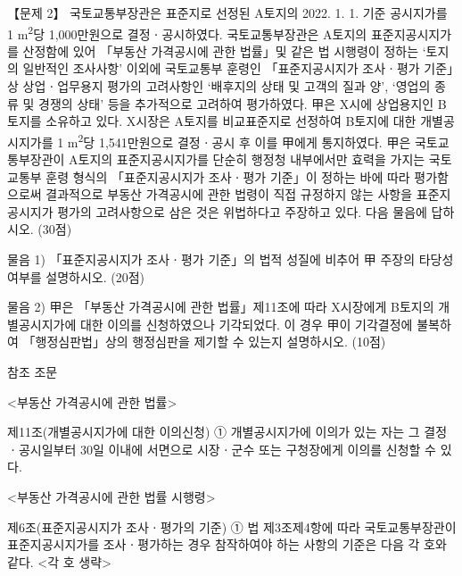 \begin{longquestion}{【문제 2】}
국토교통부장관은 표준지로 선정된 A토지의 2022. 1. 1. 기준 공시지가를 1 m\textsuperscript{2}당 1,000만원으로 결정ㆍ공시하였다. 국토교통부장관은 A토지의 표준지공시지가를 산정함에 있어 「부동산 가격공시에 관한 법률」및 같은 법 시행령이 정하는 ‘토지의 일반적인 조사사항’ 이외에 국토교통부 훈령인 「표준지공시지가 조사ㆍ평가 기준」상 상업ㆍ업무용지 평가의 고려사항인 ‘배후지의 상태 및 고객의 질과 양’, ‘영업의 종류 및 경쟁의 상태’ 등을 추가적으로 고려하여 평가하였다. 甲은 X시에 상업용지인 B토지를 소유하고 있다. X시장은 A토지를 비교표준지로 선정하여 B토지에 대한 개별공시지가를 1 m\textsuperscript{2}당 1,541만원으로 결정ㆍ공시 후 이를 甲에게 통지하였다. 甲은 국토교통부장관이 A토지의 표준지공시지가를 단순히 행정청 내부에서만 효력을 가지는 국토교통부 훈령 형식의 「표준지공시지가 조사ㆍ평가 기준」이 정하는 바에 따라 평가함으로써 결과적으로 부동산 가격공시에 관한 법령이 직접 규정하지 않는 사항을 표준지공시지가 평가의 고려사항으로 삼은 것은 위법하다고 주장하고 있다. 다음 물음에 답하시오. (30점) \par
\medskip\noindent 물음 1) 「표준지공시지가 조사ㆍ평가 기준」의 법적 성질에 비추어 甲 주장의 타당성 여부를 설명하시오. (20점) \par
\medskip\noindent 물음 2) 甲은 「부동산 가격공시에 관한 법률」제11조에 따라 X시장에게 B토지의 개별공시지가에 대한 이의를 신청하였으나 기각되었다. 이 경우 甲이 기각결정에 불복하여 「행정심판법」상의 행정심판을 제기할 수 있는지 설명하시오. (10점) \par
\begin{framedtext}
참조 조문 \par
<부동산 가격공시에 관한 법률> \par
제11조(개별공시지가에 대한 이의신청) ① 개별공시지가에 이의가 있는 자는 그 결정ㆍ공시일부터 30일 이내에 서면으로 시장ㆍ군수 또는 구청장에게 이의를 신청할 수 있다. \par
<부동산 가격공시에 관한 법률 시행령> \par
제6조(표준지공시지가 조사ㆍ평가의 기준) ① 법 제3조제4항에 따라 국토교통부장관이 표준지공시지가를 조사ㆍ평가하는 경우 참작하여야 하는 사항의 기준은 다음 각 호와 같다. <각 호 생략> \par

\end{framedtext}
\end{longquestion}
